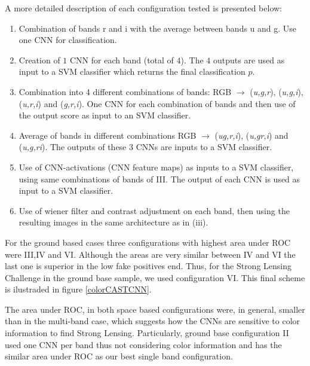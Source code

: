 \documentclass{aa}
\begin{document}
A more detailed description of each configuration tested is presented below:
\begin{enumerate}
\item Combination of bands r and i with the average between bands u and g. Use one CNN for classification.
\item Creation of $1$ CNN for each band (total of $4$). The $4$ outputs are used as input to a SVM classifier which returns the final classification $p$. 
\item Combination into 4 different combinations of bands:  RGB $\rightarrow$ (\textit{u,g,r}), (\textit{u,g,i}), (\textit{u,r,i}) and (\textit{g,r,i}). One CNN for each combination of bands and then use of the output score as input to an SVM classifier.
%
\item  Average of bands in different combinations RGB $\rightarrow$ (\textit{ug,r,i}), (\textit{u,gr,i}) and (\textit{u,g,ri}). The outputs of these 3 CNNs are inputs to a SVM classifier.
\item Use of CNN-activations (CNN feature maps) as inputs to a SVM classifier, using same combinations of bands of III. The output of each CNN is used as input to a SVM classifier.
\item Use of wiener filter and contrast adjustment on each band, then using the resulting images in the same architecture as in (iii). 
\end{enumerate}

For the ground based cases three configurations with highest area under ROC were III,IV and VI. Although the areas are very similar between IV and VI the last one is superior in the low fake positives end. Thus, for the Strong Lensing Challenge in the ground base sample, we used configuration VI. This final scheme is ilustraded in figure \ref{colorCASTCNN}.

The area under ROC, in both space based configurations were, in general, smaller than in the multi-band case, which suggests how the CNNs are sensitive to color information to find Strong Lensing. Particularly,  ground base configuration II used one CNN per band thus not considering color information and has the similar area under ROC as our best single band configuration. 

\end{document}
